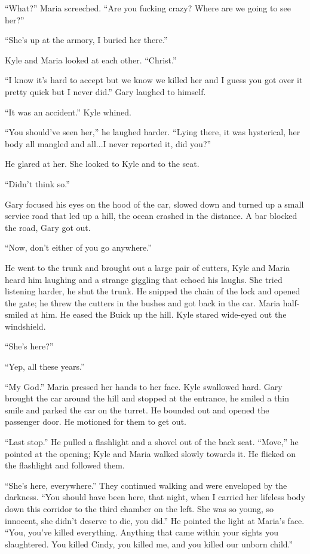 \documentclass[
]{article}
\begin{document}
``What?'' Maria screeched. ``Are you fucking crazy? Where are we going
to see her?''

``She's up at the armory, I buried her there.''

Kyle and Maria looked at each other. ``Christ.''

``I know it's hard to accept but we know we killed her and I guess you
got over it pretty quick but I never did.'' Gary laughed to himself.

``It was an accident.'' Kyle whined.

``You should've seen her,'' he laughed harder. ``Lying there, it was
hysterical, her body all mangled and all...I never reported it, did
you?''

He glared at her. She looked to Kyle and to the seat.

``Didn't think so.''

Gary focused his eyes on the hood of the car, slowed down and turned up
a small service road that led up a hill, the ocean crashed in the
distance. A bar blocked the road, Gary got out.

``Now, don't either of you go anywhere.''

He went to the trunk and brought out a large pair of cutters, Kyle and
Maria heard him laughing and a strange giggling that echoed his laughs.
She tried listening harder, he shut the trunk. He snipped the chain of
the lock and opened the gate; he threw the cutters in the bushes and got
back in the car. Maria half-smiled at him. He eased the Buick up the
hill. Kyle stared wide-eyed out the windshield.

``She's here?''

``Yep, all these years.''

``My God.'' Maria pressed her hands to her face. Kyle swallowed hard.
Gary brought the car around the hill and stopped at the entrance, he
smiled a thin smile and parked the car on the turret. He bounded out and
opened the passenger door. He motioned for them to get out.

``Last stop.'' He pulled a flashlight and a shovel out of the back seat.
``Move,'' he pointed at the opening; Kyle and Maria walked slowly
towards it. He flicked on the flashlight and followed them.

``She's here, everywhere.'' They continued walking and were enveloped by
the darkness. ``You should have been here, that night, when I carried
her lifeless body down this corridor to the third chamber on the left.
She was so young, so innocent, she didn't deserve to die, you did.'' He
pointed the light at Maria's face. ``You, you've killed everything.
Anything that came within your sights you slaughtered. You killed Cindy,
you killed me, and you killed our unborn child.''
\end{document}
